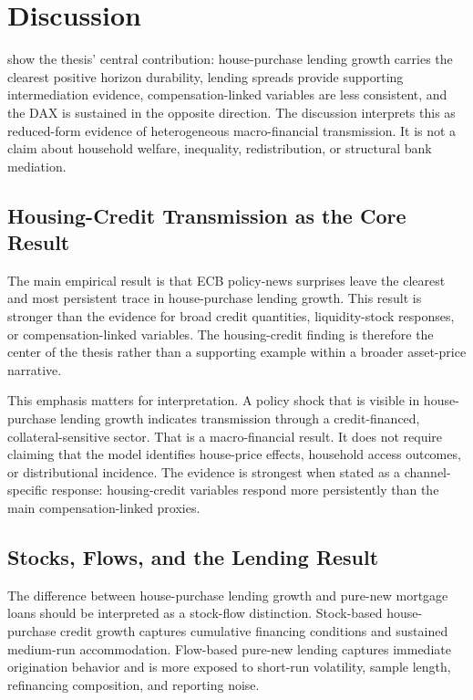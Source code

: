 \chapter{Discussion}
\label{chap:discussion}

 show the thesis' central contribution: house-purchase lending growth carries the clearest positive horizon durability, lending spreads provide supporting intermediation evidence, compensation-linked variables are less consistent, and the DAX is sustained in the opposite direction. The discussion interprets this as reduced-form evidence of heterogeneous macro-financial transmission. It is not a claim about household welfare, inequality, redistribution, or structural bank mediation.

\section{Housing-Credit Transmission as the Core Result}

The main empirical result is that ECB policy-news surprises leave the clearest and most persistent trace in house-purchase lending growth. This result is stronger than the evidence for broad credit quantities, liquidity-stock responses, or compensation-linked variables. The housing-credit finding is therefore the center of the thesis rather than a supporting example within a broader asset-price narrative.

This emphasis matters for interpretation. A policy shock that is visible in house-purchase lending growth indicates transmission through a credit-financed, collateral-sensitive sector. That is a macro-financial result. It does not require claiming that the model identifies house-price effects, household access outcomes, or distributional incidence. The evidence is strongest when stated as a channel-specific response: housing-credit variables respond more persistently than the main compensation-linked proxies.

\section{Stocks, Flows, and the Lending Result}

The difference between house-purchase lending growth and pure-new mortgage loans should be interpreted as a stock-flow distinction. Stock-based house-purchase credit growth captures cumulative financing conditions and sustained medium-run accommodation. Flow-based pure-new lending captures immediate origination behavior and is more exposed to short-run volatility, sample length, refinancing composition, and reporting noise.

